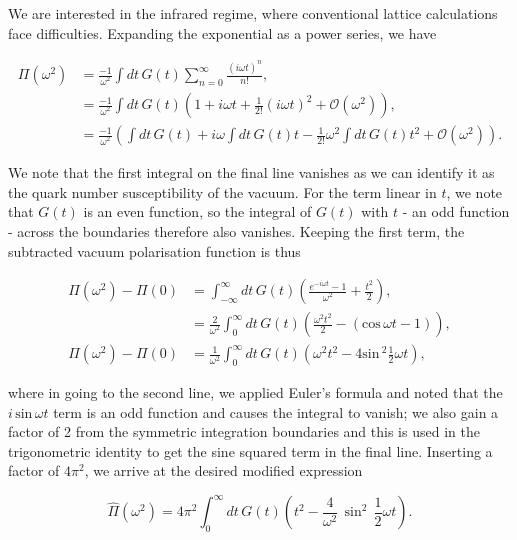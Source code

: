 \documentclass{article}
\numberwithin{equation}{section} %
\begin{document}
We are interested in the infrared regime, where conventional lattice calculations face difficulties. Expanding the exponential as a power series, we have

\begin{equation}
\begin{split}
\Pi(\omega^2)&= \frac{-1}{\omega^2}\int dt \, G(t) \sum_{n=0}^\infty \frac{(i\omega t)^n}{n!},\\
&= \frac{-1}{\omega^2}\int dt \, G(t) \left(1 +i\omega t+\frac{1}{2!}(i\omega t)^2 + \mathcal{O}(\omega^2) \right),\\
&= \frac{-1}{\omega^2} \left(\int dt \, G(t) + i\omega \int dt \, G(t)t-\frac{1}{2!}\omega^2 \int dt \, G(t)t^2 + \mathcal{O}(\omega^2) \right).
\end{split}
\end{equation}

\noindent We note that the first integral on the final line vanishes as we can identify it as the quark number susceptibility of the vacuum. For the term linear in $t$, we note that $G(t)$ is an even function, so the integral of $G(t)$ with $t$ - an odd function - across the boundaries therefore also vanishes. Keeping the first term, the subtracted vacuum polarisation function is thus

\begin{equation}
\begin{split}
\Pi(\omega^2)-\Pi(0) &= \int^\infty_{-\infty} dt \, G(t) \left( \frac{e^{-i\omega t} - 1}{\omega^2} + \frac{t^2}{2}\right),\\
&=\frac{2}{\omega^2}\int^\infty_0dt \, G(t) \left( \frac{\omega^2t^2}{2}-(\mathrm{cos\,} \omega t- 1) \right),\\
\Pi(\omega^2)-\Pi(0) &=\frac{1}{\omega^2}\int^\infty_0dt \, G(t) \left( \omega^2t^2-4\mathrm{sin\,}^2 \frac{1}{2}\omega t \right),
\end{split}
\end{equation}

\noindent where in going to the second line, we applied Euler's formula and noted that the $i\, \mathrm{sin\,}\omega t$ term is an odd function and causes the integral to vanish; we also gain a factor of 2 from the symmetric integration boundaries and this is used in the trigonometric identity to get the sine squared term in the final line. Inserting a factor of $4\pi^2$, we arrive at the desired modified expression

\begin{equation}
\hat{\Pi}(\omega^2) = 4\pi^2\int^\infty_0 dt\, G(t) \left( t^2-\frac{4}{\omega^2}\,\sin^2\, \frac{1}{2}\omega t \right).
\end{equation}
\end{document}
